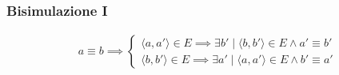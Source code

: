 \documentclass{beamer}
\begin{document}
\begin{frame}\frametitle{Bisimulazione I}
    \begin{gather*}
        a \equiv b \implies
        \begin{cases}
            \langle a, a' \rangle \in E \implies \exists b' \mid \langle b, b' \rangle \in E \land a' \equiv b'\\
            \langle b, b' \rangle \in E \implies \exists a' \mid \langle a, a' \rangle \in E \land b' \equiv a'
        \end{cases}
    \end{gather*}

    \begin{figure}
    \end{figure}
\end{frame}
\end{document}
